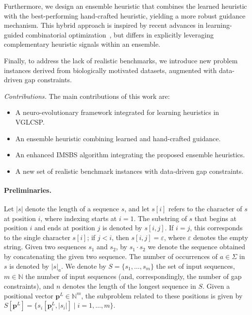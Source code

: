 \documentclass[runningheads]{llncs}
\begin{document}
Furthermore, we design an ensemble heuristic that combines the learned heuristic with the best-performing hand-crafted heuristic, yielding a more robust guidance mechanism. This hybrid approach is inspired by recent advances in learning-guided combinatorial optimization~\cite{djukanovic2025learning,reixach2024neural,wu2021learning}, but differs in explicitly leveraging complementary heuristic signals within an ensemble.

Finally, to address the lack of realistic benchmarks, we introduce new problem instances derived from biologically motivated datasets, augmented with data-driven gap constraints.

\medskip
\noindent\textit{Contributions.} The main contributions of this work are:
\begin{itemize}
	\item A neuro-evolutionary framework integrated for learning heuristics in VGLCSP.
	\item An ensemble heuristic combining learned and hand-crafted guidance.
	\item An enhanced IMSBS algorithm integrating the proposed ensemble heuristics.
	\item A new set of realistic benchmark instances with data-driven gap constraints.
\end{itemize}

\paragraph{Preliminaries.}	Let $|s|$ denote the length of a sequence $s$, and let $s[i]$ refers to the character of $s$ at position $i$, where indexing starts at $i = 1$. The substring of $s$ that begins at position $i$ and ends at position $j$ is denoted by $s[i,j]$. If $i = j$, this corresponds to the single character $s[i]$; if $j < i$, then $s[i,j] = \varepsilon$, where $\varepsilon$ denotes the empty string.	Given two sequences $s_1$ and $s_2$, by $s_1 \cdot s_2$ we denote the sequence obtained by concatenating the given two sequence. 
The number of occurrences of $a \in \Sigma$ in $s$ is denoted by $|s|_a$.	We denote by $S = \{s_1, \ldots, s_m\}$ the set of input sequences, $m \in \mathbb{N}$ the number of input sequences (and, correspondingly, the number of gap constraints), and $n$ denotes the length of the longest sequence in $S$.  Given a positional vector $\mathbf{p}^L \in \mathbb{N}^m$,  the subproblem related to these positions is given by $S[\mathbf{p}^L]=\{ s_i[\mathbf{p}^L_i, |s_i|] \mid i=1, \ldots, m\}$. \\
  
\end{document}
